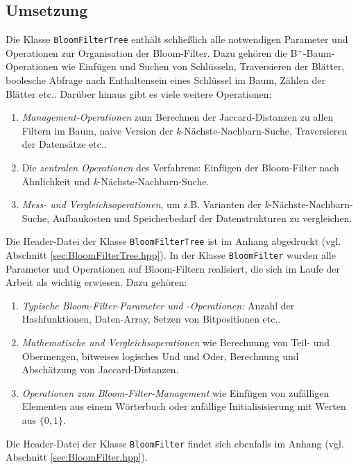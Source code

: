 \subsection{Umsetzung}\label{sec:umsetzung}
Die Klasse \texttt{BloomFilterTree} enthält schließlich alle notwendigen Parameter und Operationen zur Organisation der Bloom-Filter. Dazu gehören die B$^+$-Baum-Operationen wie Einfügen und Suchen von Schlüsseln, Traversieren der Blätter, boolesche Abfrage nach Enthaltensein eines Schlüssel im Baum, Zählen der Blätter etc.. Darüber hinaus gibt es viele weitere Operationen: 
\begin{enumerate}
	\item \textit{Management-Operationen} zum Berechnen der Jaccard-Distanzen zu allen Filtern im Baum, naive Version der \textit{k}-Nächste-Nachbarn-Suche, Traversieren der Datensätze etc..
	\item Die \textit{zentralen Operationen} des Verfahrens: Einfügen der Bloom-Filter nach Ähnlichkeit und \textit{k}-Nächste-Nachbarn-Suche. 
	\item \textit{Mess- und Vergleichsoperationen}, um z.B. Varianten der \textit{k}-Nächste-Nachbarn-Suche, Aufbaukosten und Speicherbedarf der Datenstrukturen zu vergleichen. 
\end{enumerate}
Die Header-Datei der Klasse \texttt{BloomFilterTree} ist im Anhang abgedruckt (vgl. Abschnitt \ref{sec:BloomFilterTree.hpp}). In der Klasse \texttt{BloomFilter} wurden alle Parameter und Operationen auf Bloom-Filtern realisiert, die sich im Laufe der Arbeit als wichtig erwiesen. Dazu gehören: 
\begin{enumerate}
	\item \textit{Typische Bloom-Filter-Parameter und -Operationen:} Anzahl der Hashfunktionen, Daten-Array, Setzen von Bitpositionen etc..
	\item \textit{Mathematische und Vergleichsoperationen} wie Berechnung von Teil- und Obermengen, bitweises logisches Und und Oder, Berechnung und Abschätzung von Jaccard-Distanzen.
	\item \textit{Operationen zum Bloom-Filter-Management} wie Einfügen von zufälligen Elementen aus einem Wörterbuch oder zufällige Initialisisierung mit Werten aus $\{0,1\}$.
\end{enumerate}
Die Header-Datei der Klasse \texttt{BloomFilter} findet sich ebenfalls im Anhang (vgl. Abschnitt \ref{sec:BloomFilter.hpp}).
